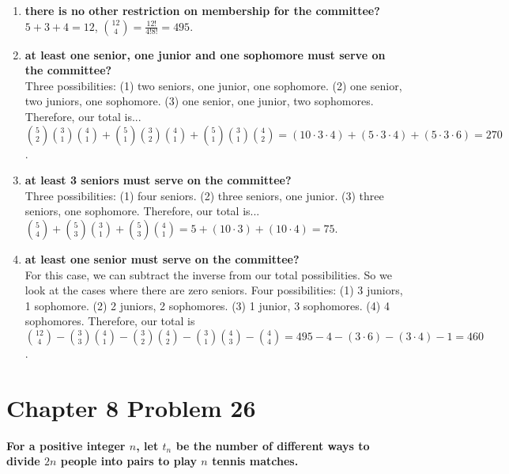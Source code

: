\documentclass[10pt]{article}
\begin{document}
\begin{enumerate}[label=(\alph*)]
    \item \textbf{there is no other restriction on membership for the committee?} \\
        $5 + 3 + 4 = 12$, $\binom{12}{4} = \frac{12!}{4!8!} = 495$.

    \item \textbf{at least one senior, one junior and one sophomore must serve on the committee?} \\
        Three possibilities: (1) two seniors, one junior, one sophomore.  (2) one senior, two juniors, one sophomore.  (3) one senior, one junior,
        two sophomores.  Therefore, our total is... \\
        $\binom52\binom31\binom41 + \binom51\binom32\binom41 + \binom51\binom31\binom42 = (10\cdot3\cdot4) + (5\cdot3\cdot4) + (5\cdot3\cdot6) = 270$.

    \item \textbf{at least 3 seniors must serve on the committee?} \\
        Three possibilities: (1) four seniors.  (2) three seniors, one junior.  (3) three seniors, one sophomore.  Therefore, our total is... \\
        $\binom54 + \binom53\binom31 + \binom53\binom41 = 5 + (10\cdot3) + (10\cdot4) = 75$.

    \item \textbf{at least one senior must serve on the committee?} \\
        For this case, we can subtract the inverse from our total possibilities.  So we look at the cases where there are zero seniors.  Four
        possibilities: (1) 3 juniors, 1 sophomore.  (2) 2 juniors, 2 sophomores.  (3) 1 junior, 3 sophomores.  (4) 4 sophomores.  Therefore, our total
        is \\
        $\binom{12}{4} - \binom33\binom41 - \binom32\binom42 - \binom31\binom43 - \binom44 = 495 - 4 - (3\cdot6) - (3\cdot4) - 1 = 460$.

\end{enumerate}


\section{Chapter 8 Problem 26}
\textbf{For a positive integer $n$, let $t_n$ be the number of different ways to divide $2n$ people into pairs to play $n$
tennis matches.}
\end{document}
